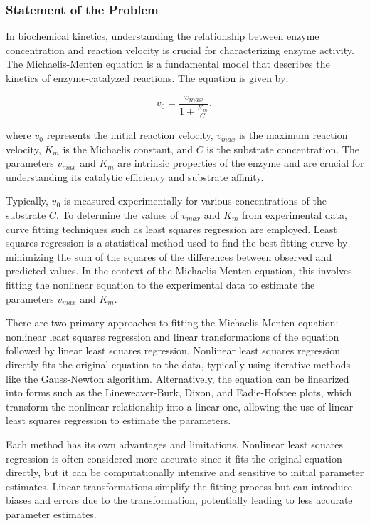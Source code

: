 \documentclass{article} %
\theoremstyle{definition}
\theoremstyle{remark}
\theoremstyle{plain}
\begin{document}
\subsubsection{Statement of the Problem}

In biochemical kinetics, understanding the relationship between enzyme concentration and reaction velocity is crucial for characterizing enzyme activity. The Michaelis-Menten equation is a fundamental model that describes the kinetics of enzyme-catalyzed reactions. The equation is given by:

\[
v_0 = \frac{v_{max}}{1 + \frac{K_m}{C}},
\]

where \(v_0\) represents the initial reaction velocity, \(v_{max}\) is the maximum reaction velocity, \(K_m\) is the Michaelis constant, and \(C\) is the substrate concentration. The parameters \(v_{max}\) and \(K_m\) are intrinsic properties of the enzyme and are crucial for understanding its catalytic efficiency and substrate affinity.

Typically, \(v_0\) is measured experimentally for various concentrations of the substrate \(C\). To determine the values of \(v_{max}\) and \(K_m\) from experimental data, curve fitting techniques such as least squares regression are employed. Least squares regression is a statistical method used to find the best-fitting curve by minimizing the sum of the squares of the differences between observed and predicted values. In the context of the Michaelis-Menten equation, this involves fitting the nonlinear equation to the experimental data to estimate the parameters \(v_{max}\) and \(K_m\).

There are two primary approaches to fitting the Michaelis-Menten equation: nonlinear least squares regression and linear transformations of the equation followed by linear least squares regression. Nonlinear least squares regression directly fits the original equation to the data, typically using iterative methods like the Gauss-Newton algorithm. Alternatively, the equation can be linearized into forms such as the Lineweaver-Burk, Dixon, and Eadie-Hofstee plots, which transform the nonlinear relationship into a linear one, allowing the use of linear least squares regression to estimate the parameters.

Each method has its own advantages and limitations. Nonlinear least squares regression is often considered more accurate since it fits the original equation directly, but it can be computationally intensive and sensitive to initial parameter estimates. Linear transformations simplify the fitting process but can introduce biases and errors due to the transformation, potentially leading to less accurate parameter estimates.
\end{document}
